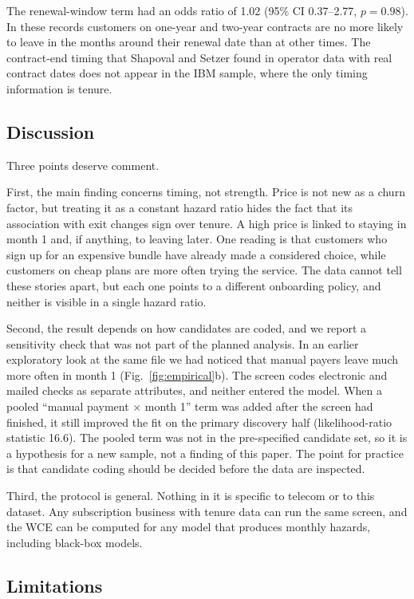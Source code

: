 \documentclass[conference]{IEEEtran}
\begin{document}
The renewal-window term had an odds ratio of 1.02 (95\% CI 0.37--2.77, $p = 0.98$). In these records customers on one-year and two-year contracts are no more likely to leave in the months around their renewal date than at other times. The contract-end timing that Shapoval and Setzer \cite{shapoval2015} found in operator data with real contract dates does not appear in the IBM sample, where the only timing information is tenure.

\subsection{Discussion}

Three points deserve comment.

First, the main finding concerns timing, not strength. Price is not new as a churn factor, but treating it as a constant hazard ratio hides the fact that its association with exit changes sign over tenure. A high price is linked to staying in month 1 and, if anything, to leaving later. One reading is that customers who sign up for an expensive bundle have already made a considered choice, while customers on cheap plans are more often trying the service. The data cannot tell these stories apart, but each one points to a different onboarding policy, and neither is visible in a single hazard ratio.

Second, the result depends on how candidates are coded, and we report a sensitivity check that was not part of the planned analysis. In an earlier exploratory look at the same file we had noticed that manual payers leave much more often in month 1 (Fig.~\ref{fig:empirical}b). The screen codes electronic and mailed checks as separate attributes, and neither entered the model. When a pooled ``manual payment $\times$ month 1'' term was added after the screen had finished, it still improved the fit on the primary discovery half (likelihood-ratio statistic 16.6). The pooled term was not in the pre-specified candidate set, so it is a hypothesis for a new sample, not a finding of this paper. The point for practice is that candidate coding should be decided before the data are inspected.

Third, the protocol is general. Nothing in it is specific to telecom or to this dataset. Any subscription business with tenure data can run the same screen, and the WCE can be computed for any model that produces monthly hazards, including black-box models.

\subsection{Limitations}
\end{document}
